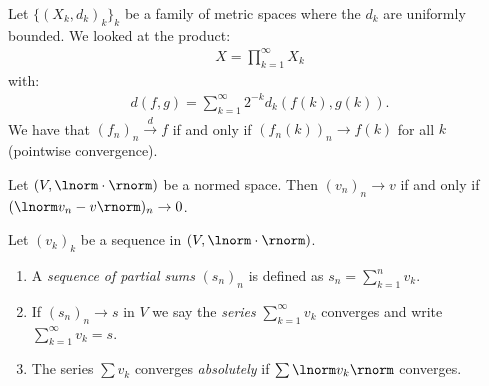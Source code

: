     \begin{example}
        Let $\{(X_k,d_k)_k\}_k$ be a family of metric spaces where the $d_k$ are uniformly bounded. We looked at the product:
            \begin{equation*}
            \begin{split}
                X = \prod_{k = 1}^\infty X_k
            \end{split}
            \end{equation*}
        with:
            \begin{equation*}
            \begin{split}
                d(f,g) = \sum_{k = 1}^\infty 2^{-k}d_k(f(k),g(k)).
            \end{split}
            \end{equation*}
        We have that $(f_n)_n \xrightarrow{d} f$ if and only if $(f_n(k))_n \rightarrow f(k)$ for all $k$ (pointwise convergence).
    \end{example}

    \begin{example}
        Let $(V,\lnorm \cdot \rnorm)$ be a normed space. Then $(v_n)_n \rightarrow v$ if and only if $(\lnorm v_n - v \rnorm)_n \rightarrow 0$.
    \end{example}

    \begin{definition}
        Let $(v_k)_k$ be a sequence in $(V,\lnorm \cdot \rnorm)$.
        \begin{enumerate}[label = (\arabic*),itemsep=1pt,topsep=3pt]
            \item A \textit{sequence of partial sums} $(s_n)_n$ is defined as $s_n = \sum_{k = 1}^n v_k$.
            \item If $(s_n)_n \rightarrow s$ in $V$ we say the \textit{series} $\sum_{k = 1}^\infty v_k$ converges and write $\sum_{k = 1}^\infty v_k = s$.
            \item The series $\sum v_k$ converges \textit{absolutely} if $\sum \lnorm v_k \rnorm$ converges.
        \end{enumerate}
    \end{definition}

    \begin{center}
    \end{center}

